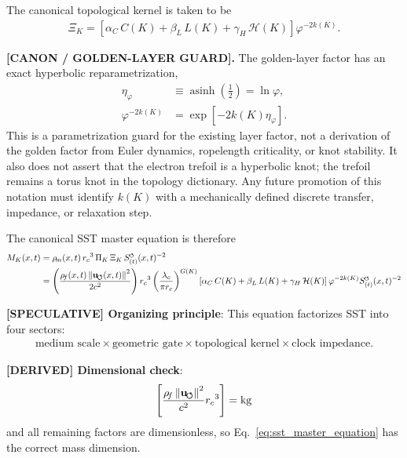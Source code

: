 \documentclass[11pt]{article}
\theoremstyle{definition}
\theoremstyle{plain}
\theoremstyle{remark}
\newcommand{\swirlarrow}{\mathchoice{\mkern-2mu\scriptstyle\boldsymbol{\circlearrowleft}}{\mkern-2mu\scriptstyle\boldsymbol{\circlearrowleft}}{\mkern-2mu\scriptscriptstyle\boldsymbol{\circlearrowleft}}{\mkern-2mu\scriptscriptstyle\boldsymbol{\circlearrowleft}}}
\newcommand{\rhoF}{{\rho_{\!f}}}
\newcommand{\rhoM}{\rho_{\!m}}
\newcommand{\SwirlClock}{{S_{(t)}^{\swirlarrow}}}
\newcommand{\rc}{{r_c}}
\newcommand{\uswirl}{\mathbf{u}_{\!\boldsymbol{\circlearrowleft}}}
\begin{document}
        The canonical topological kernel is taken to be
        \begin{align}
            \Xi_K = \left[ \alpha_C\,C(K) + \beta_L\,L(K) + \gamma_H\,\mathcal{H}(K) \right] \varphi^{-2k(K)} .
        \end{align}

        \textbf{[CANON / GOLDEN-LAYER GUARD].}
        The golden-layer factor has an exact hyperbolic reparametrization,
        \begin{align}
            \eta_\varphi
            &\equiv
            \operatorname{asinh}\!\left(\frac12\right)
            =\ln\varphi,
            \label{eq:golden_layer_rapidity_def}\\
            \varphi^{-2k(K)}
            &=
            \exp\!\left[-2k(K)\eta_\varphi\right].
            \label{eq:golden_layer_rapidity_guard}
        \end{align}
        This is a parametrization guard for the existing layer factor, not a
        derivation of the golden factor from Euler dynamics, ropelength
        criticality, or knot stability.  It also does not assert that the
        electron trefoil is a hyperbolic knot; the trefoil remains a torus knot
        in the topology dictionary.  Any future promotion of this notation must
        identify \(k(K)\) with a mechanically defined discrete transfer,
        impedance, or relaxation step.

        The canonical SST master equation is therefore
        \begin{align}
            M_K(x,t)
            &= \rhoM(x,t)\,\rc^3\,\Pi_K\,\Xi_K\,\SwirlClock(x,t)^{-2} \\
            &= \left( \frac{\rhoF(x,t)\,\norm{\uswirl(x,t)}^2}{2c^2} \right)
               \rc^3
               \left( \frac{\lambda_c}{\pi \rc} \right)^{G(K)}
               \left[ \alpha_C\,C(K) + \beta_L\,L(K) + \gamma_H\,\mathcal{H}(K) \right]
               \varphi^{-2k(K)}
               \SwirlClock(x,t)^{-2}
            \label{eq:sst_master_equation}
        \end{align}

        \textbf{[SPECULATIVE] Organizing principle}: This equation factorizes SST into four sectors:
        \begin{align}
            \text{medium scale} \times \text{geometric gate} \times \text{topological kernel} \times \text{clock impedance} .
        \end{align}

        \textbf{[DERIVED] Dimensional check}:
        \begin{align}
            \left[ \frac{\rhoF\,\norm{\uswirl}^2}{c^2} \rc^3 \right] = \mathrm{kg}
        \end{align}
        and all remaining factors are dimensionless, so Eq.~\ref{eq:sst_master_equation} has the correct mass dimension.
\end{document}
